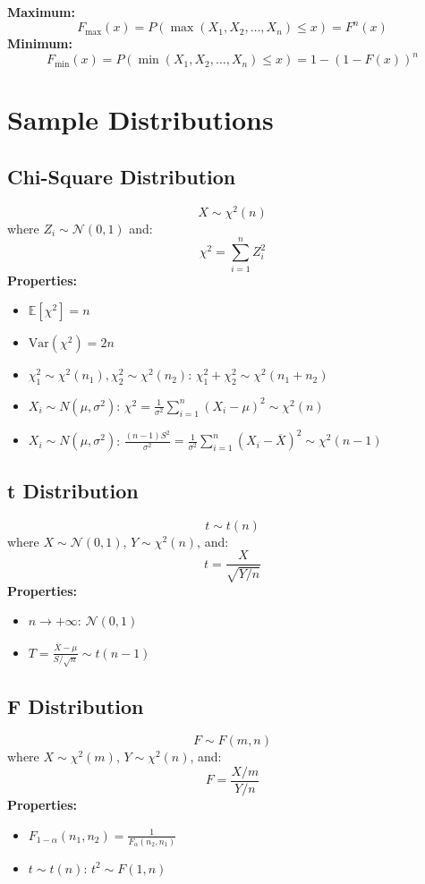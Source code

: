\documentclass{article}
\begin{document}
\textbf{Maximum:}
\[
    F_{\max}(x) = P\left(\max(X_1, X_2, \ldots, X_n) \leq x\right) = F^n(x)
\]
\textbf{Minimum:}
\[
    F_{\min}(x) = P\left(\min(X_1, X_2, \ldots, X_n) \leq x\right) = 1 - (1 - F(x))^n
\]


\newpage
\section{Sample Distributions}

\subsection{Chi-Square Distribution}
\[
    X \sim \chi^2(n)
\]
where $Z_i \sim \mathcal{N}(0,1)$ and:
\[
    \chi^2 = \sum_{i=1}^{n} Z_i^2
\]
\textbf{Properties:}
\begin{itemize}
    \item $\mathbb{E}[\chi^2] = n$
    \item $\text{Var}(\chi^2) = 2n$
    \item $\chi_1^2 \sim \chi^2(n_1), \chi_2^2 \sim \chi^2(n_2)$: $\chi_1^2 + \chi_2^2 \sim \chi^2(n_1 + n_2)$
    \item $X_i \sim N(\mu, \sigma^2)$: $\chi^2 = \frac{1}{\sigma^2}\sum_{i=1}^{n}(X_i - \mu)^2 \sim \chi^2(n)$
    \item $X_i \sim N(\mu, \sigma^2)$: $\frac{(n-1)S^2}{\sigma^2} = \frac{1}{\sigma^2}\sum_{i=1}^{n}(X_i - \overline{X})^2 \sim \chi^2(n-1)$
\end{itemize}

\subsection{t Distribution}
\[
    t \sim t(n)
\]
where $X \sim \mathcal{N}(0,1)$, $Y \sim \chi^2(n)$, and:
\[
    t = \frac{X}{\sqrt{Y/n}}
\]
\textbf{Properties:}
\begin{itemize}
    \item $n \rightarrow +\infty$: $\mathcal{N}(0,1)$
    \item $T = \frac{\overline{X} - \mu}{S/\sqrt{n}} \sim t(n-1)$
\end{itemize}

\subsection{F Distribution}
\[
    F \sim F(m,n)
\]
where $X \sim \chi^2(m)$, $Y \sim \chi^2(n)$, and:
\[
    F = \frac{X/m}{Y/n}
\]
\textbf{Properties:}
\begin{itemize}
    \item $F_{1-\alpha}(n_1, n_2) = \frac{1}{F_\alpha(n_2, n_1)}$
    \item $t \sim t(n)$: $t^2 \sim F(1, n)$
\end{itemize}
\end{document}
